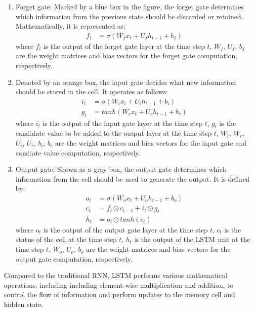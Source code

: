\begin{enumerate}
	\item Forget gate:	Marked by a blue box in the figure, the forget gate determines which information from the previous state should be discarded or retained. Mathematically, it is represented as:
	\begin{align}
		f_{t} &= \sigma(W_{f}x_{t} + U_{f}h_{t-1} + b_{f})
	\end{align}
	where $f_{t}$ is the output of the forget gate layer at the time step $t$, $W_{f}$, $U_{f}$, $b_{f}$ are the weight matrices and bias vectors for the forget gate computation, respectively.

	\item Denoted by an orange box, the input gate decides what new information should be stored in the cell. It operates as follows:
	\begin{align}
		i_{t} &= \sigma(W_{i}x_{t} + U_{i}h_{t-1} + b_{i}) \\
		g_{t} &= tanh(W_{c}x_{t} + U_{c}h_{t-1} + b_{c}) 
	\end{align}
	where $i_{t}$ is the output of the input gate layer at the time step $t$, $g_{t}$ is the candidate value to be added to the output layer at the time step $t$, $W_{i}$, $W_{c}$, $U_{i}$, $U_{c}$, $b_{i}$, $b_{c}$ are the weight matrices and bias vectors for the input gate and candiate value computation, respectively.
	
	\item Output gate:	Shown as a gray box, the output gate determines which information from the cell should be used to generate the output. It is defined by:
	\begin{align}
		o_{t} &= \sigma(W_{o}x_{t} + U_{o}h_{t-1} + b_{o}) \\
		c_{t} &= f_{t} \odot c_{t-1} + i_{t} \odot g_{t} \\
		h_{t} &= o_{t} \odot tanh(c_{t})
	\end{align}
	where $o_{t}$ is the output of the output gate layer at the time step $t$, $c_{t}$ is the status of the cell at the time step $t$, $h_{t}$ is the output of the LSTM unit at the time step $t$, $W_{o}$, $U_{o}$, $b_{o}$ are the weight matrices and bias vectors for the output gate computation, respectively.
\end{enumerate}
Compared to the traditional RNN, LSTM performs various mathematical operations, including including element-wise multiplication and addition, to control the flow of information and perform updates to the memory cell and hidden state.

